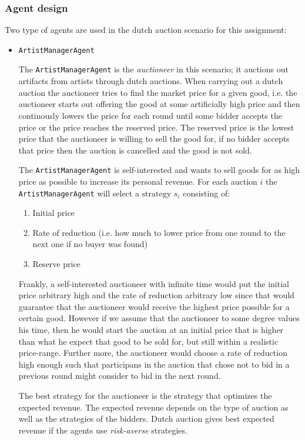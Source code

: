 \documentclass[a4paper, 11pt]{article}
\begin{document}
\subsubsection*{Agent design}
Two type of agents are used in the dutch auction scenario for this assignment:
\begin{itemize} 
\item \texttt{ArtistManagerAgent} 

The \texttt{ArtistManagerAgent} is the \textit{auctioneer} in this scenario; it auctions out artifacts from artists through dutch auctions. When carrying out a dutch auction the auctioneer tries to find the market price for a given good, i.e. the auctioneer starts out offering the good at some artificially high price and then continously lowers the price for each round until some bidder accepts the price or the price reaches the reserved price. The reserved price is the lowest price that the auctioneer is willing to sell the good for, if no bidder accepts that price then the auction is cancelled and the good is not sold. 

The \texttt{ArtistManagerAgent} is self-interested and wants to sell goods for as high price as possible to increase its personal revenue. For each auction $i$ the  \texttt{ArtistManagerAgent} will select a $\text{strategy }s_i$ consisting of:
\begin{enumerate}[I]
\item Initial price
\item Rate of reduction (i.e. how much to lower price from one round to the next one if no buyer was found)
\item Reserve price
\end{enumerate}
Frankly, a self-interested auctioneer with infinite time would put the initial price arbitrary high and the rate of reduction arbitrary low since that would guarantee that the auctioneer would receive the highest price possible for a certain good. However if we assume that the auctioneer to some degree values his time, then he would start the auction at an initial price that is higher than what he expect that good to be sold for, but still within a realistic price-range. Further more, the auctioneer would choose a rate of reduction high enough such that participans in the auction that chose not to bid in a previous round might consider to bid in the next round. 

The best strategy for the auctioneer is the strategy that optimizes the expected revenue. The expected revenue depends on the type of auction as well as the strategies of the bidders. Dutch auction gives best expected revenue if the agents use \textit{risk-averse} strategies.


\end{itemize}
\end{document}
